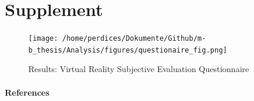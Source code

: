 \documentclass[12pt,oneside,openright]{report}
\begin{document}
\pagebreak

\newpage



\section*{Supplement}
    \begin{figure}[H]
        \centering
        \texttt{[image: /home/perdices/Dokumente/Github/m-b\_thesis/Analysis/figures/questionaire\_fig.png]}
        \caption{Results: Virtual Reality Subjective Evaluation Questionnaire}
        \label{fig:quest}
    \end{figure}
  

\pagebreak
\paragraph{\textbf{References}}
\printbibliography[heading=none]
\end{document}
